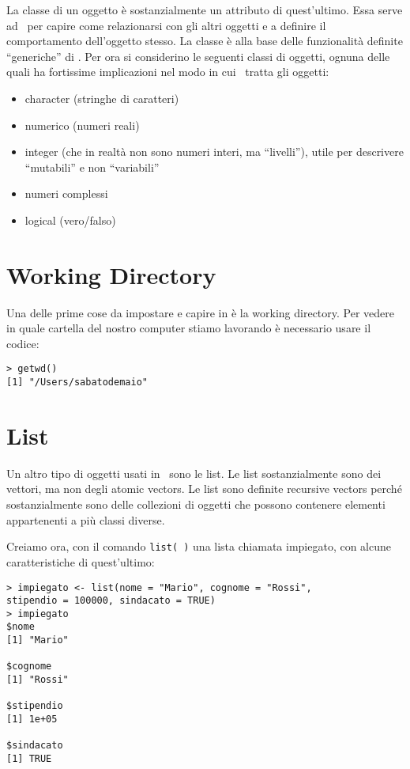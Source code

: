 La classe di un oggetto è sostanzialmente un attributo di quest'ultimo. Essa serve ad \erre\ per capire come relazionarsi con gli altri oggetti e a definire il comportamento dell'oggetto stesso. La classe è alla base delle funzionalità definite ``generiche''  di \erre.
%
Per ora si considerino le seguenti classi di oggetti, ognuna delle quali ha fortissime implicazioni nel modo in cui \erre\ tratta gli oggetti:

\begin{itemize}
\item character (stringhe di caratteri)
\item numerico (numeri reali)
\item integer (che in realtà non sono numeri interi, ma ``livelli''), utile per descrivere ``mutabili'' e non ``variabili''
\item numeri complessi
\item logical (vero/falso)
\end{itemize}

\section{Working Directory}

Una delle prime cose da impostare e capire in \erre è la working directory. Per vedere in quale cartella del nostro computer stiamo lavorando è necessario usare il codice:
\begin{lstlisting}
> getwd()
[1] "/Users/sabatodemaio"
\end{lstlisting}


\section{List}
Un altro tipo di oggetti usati in \erre\ sono le list. Le list sostanzialmente sono dei vettori, ma non degli atomic vectors. Le list sono definite recursive vectors perché sostanzialmente sono delle collezioni di oggetti che possono contenere elementi appartenenti a più classi diverse.

Creiamo ora, con il comando \lstinline!list( )! una lista chiamata impiegato, con alcune caratteristiche di quest'ultimo:

\begin{lstlisting}
> impiegato <- list(nome = "Mario", cognome = "Rossi", 
stipendio = 100000, sindacato = TRUE)
> impiegato
$nome
[1] "Mario"

$cognome
[1] "Rossi"

$stipendio
[1] 1e+05

$sindacato
[1] TRUE
\end{lstlisting}

